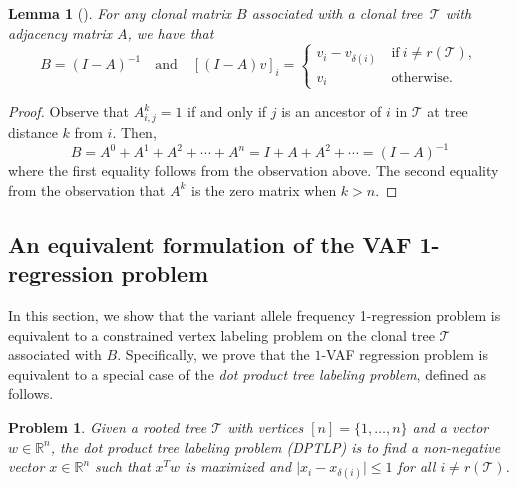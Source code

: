 \documentclass[10pt]{article}
\newtheorem{lemma}{Lemma}
\newtheorem{problem}{Problem}
\newcommand{\tree}{\mathcal{T}}
\begin{document}
\begin{lemma}[\cite{jia_efficient_2018}]
    \label{lemma:clonal_inverse}
    For any clonal matrix $B$ associated with a clonal tree $\,\tree$ with adjacency matrix $A$,
    we have that
    \[
        B = (I - A)^{-1} \quad\text{and}\quad [(I - A)v]_i = \begin{cases}
            v_i - v_{\delta(i)} &\ \text{if}\  i \neq r(\tree), \\
            v_i &\ \text{otherwise}.
        \end{cases}
    \]
\end{lemma}
\begin{proof}
    Observe that $A^k_{i,j} = 1$ if and only if $j$ is an ancestor of $i$ in $\tree$
    at tree distance $k$ from $i$. Then,
    \[B = A^0 + A^1 + A^2 + \cdots + A^{n} = I + A + A^2 + \cdots = (I - A)^{-1}\] 
    where the first equality follows from the observation above. The
    second equality from the observation that $A^k$ is the zero matrix when 
    $k > n$.
\end{proof}

\subsection{An equivalent formulation of the VAF 1-regression problem}
\label{sec:equivalent_formulations}

In this section, we show that the variant allele frequency 1-regression problem is 
equivalent to a constrained vertex labeling problem on the clonal tree $\tree$ associated with $B$.
Specifically, we prove that the $1$-VAF regression problem is equivalent to a special case of 
the \emph{dot product tree labeling problem}, defined as follows.
\begin{problem}
\label{prob:dot_product_tree_labeling}
Given a rooted tree $\tree$ with vertices $[n] = \{1, \ldots, n\}$ and a vector $w \in \mathbb{R}^n$,
the \emph{dot product tree labeling problem} (DPTLP) is to
find a non-negative vector $x \in \mathbb{R}^n$ such that $x^Tw$ is maximized
and $\lvert x_i - x_{\delta(i)}\rvert \leq 1$ for all $i \neq r(\tree)$. 
\end{problem}
\end{document}
